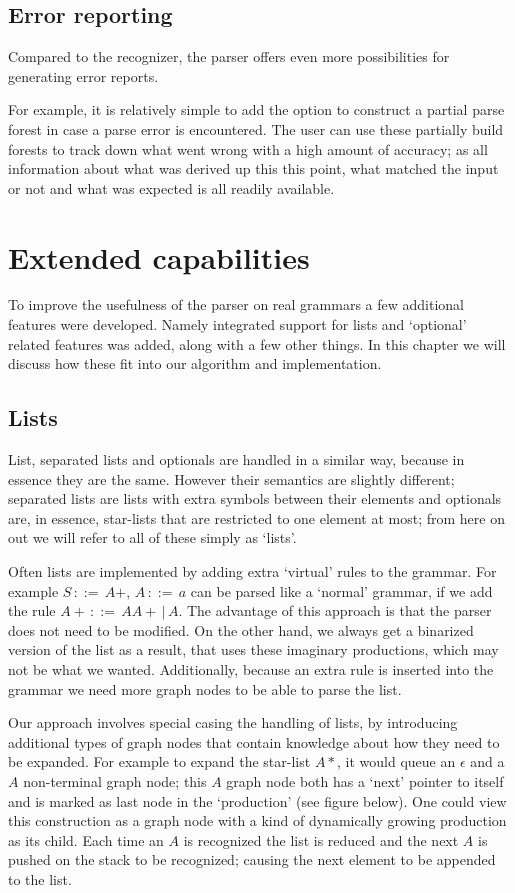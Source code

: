 \documentclass[a4paper,10pt]{article}
\begin{document}
\subsection{Error reporting}

Compared to the recognizer, the parser offers even more possibilities for generating error reports.

For example, it is relatively simple to add the option to construct a partial parse forest in case a parse error is encountered. The user can use these partially build forests to track down what went wrong with a high amount of accuracy; as all information about what was derived up this this point, what matched the input or not and what was expected is all readily available.

\section{Extended capabilities}

To improve the usefulness of the parser on real grammars a few additional features were developed. Namely integrated support for lists and `optional' related features was added, along with a few other things. In this chapter we will discuss how these fit into our algorithm and implementation.

\subsection{Lists}

List, separated lists and optionals are handled in a similar way, because in essence they are the same. However their semantics are slightly different; separated lists are lists with extra symbols between their elements and optionals are, in essence, star-lists that are restricted to one element at most; from here on out we will refer to all of these simply as `lists'.

Often lists are implemented by adding extra `virtual' rules to the grammar. For example $S\,::=\,A+,\,A\,::=\,a$ can be parsed like a `normal' grammar, if we add the rule $A+\,::=\,AA+\,|\,A$. The advantage of this approach is that the parser does not need to be modified. On the other hand, we always get a binarized version of the list as a result, that uses these imaginary productions, which may not be what we wanted. Additionally, because an extra rule is inserted into the grammar we need more graph nodes to be able to parse the list.

Our approach involves special casing the handling of lists, by introducing additional types of graph nodes that contain knowledge about how they need to be expanded. For example to expand the star-list $A*$, it would queue an $\epsilon$ and a $A$ non-terminal graph node; this $A$ graph node both has a `next' pointer to itself and is marked as last node in the `production' (see figure below). One could view this construction as a graph node with a kind of dynamically growing production as its child. Each time an $A$ is recognized the list is reduced and the next $A$ is pushed on the stack to be recognized; causing the next element to be appended to the list.
\end{document}
